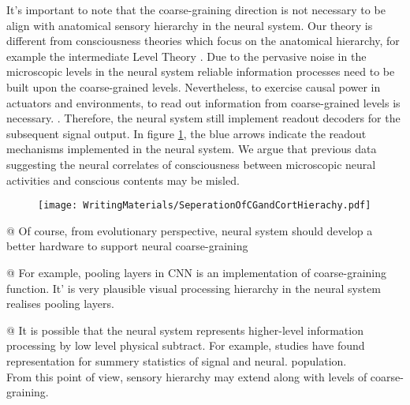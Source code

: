 		It's important to note that the coarse-graining direction is not necessary to be align with  anatomical sensory hierarchy in the neural system. Our theory is different from consciousness theories which focus on the anatomical hierarchy, for example the intermediate Level Theory \citep[see also \ref{IntermediateLevelTheory}]{prinz2007intermediate, jackendoff1987consciousness}. Due to the pervasive noise in the microscopic levels in the neural system reliable information processes need to be built upon the coarse-grained levels. Nevertheless, to exercise causal power in actuators and environments, to read out information from coarse-grained levels is necessary. . Therefore, the neural system still implement readout decoders for the subsequent signal output. In figure \ref{fig:hierarchy}, the blue arrows indicate the readout mechanisms implemented in the neural system. We argue that previous data suggesting the neural correlates of consciousness between microscopic neural activities and conscious contents may be misled. 

		
			\begin{figure}[H]
				\texttt{[image: WritingMaterials/SeperationOfCGandCortHierachy.pdf]}
				\label{fig:hierarchy}
			\end{figure}


			\begin{WritingMaterials}
				@ Of course, from evolutionary perspective, neural system should develop a better hardware to support neural coarse-graining

				@ For example, pooling layers in CNN is an implementation of coarse-graining function. It' is very plausible visual processing hierarchy in the neural system realises pooling layers.


				@ It is possible that the neural system represents higher-level information processing by low level physical subtract. For example, studies have found representation for summery statistics of signal and neural. population.\\
				From this point of view, sensory hierarchy may extend along with levels of coarse-graining.
			\end{WritingMaterials}
		

		
			   
\rlend

